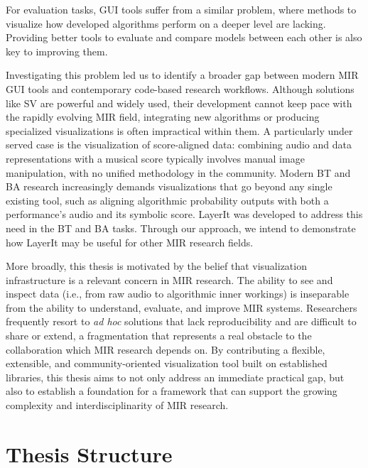 For evaluation tasks, \ac{GUI} tools suffer from a similar problem, where methods to visualize how developed algorithms perform on a deeper level are lacking. Providing better tools to evaluate and compare models between each other is also key to improving them.

Investigating this problem led us to identify a broader gap between modern \ac{MIR} \ac{GUI} tools and contemporary code-based research workflows. Although solutions like \ac{SV} are powerful and widely used, their development cannot keep pace with the rapidly evolving \ac{MIR} field, integrating new algorithms or producing specialized visualizations is often impractical within them. A particularly under served case is the visualization of score-aligned data: combining audio and data representations with a musical score typically involves manual image manipulation, with no unified methodology in the community. Modern \ac{BT} and \ac{BA} research increasingly demands visualizations that go beyond any single existing tool, such as aligning algorithmic probability outputs with both a performance's audio and its symbolic score. LayerIt was developed to address this need in the \ac{BT} and \ac{BA} tasks. Through our approach, we intend to demonstrate how LayerIt may be useful for other \ac{MIR} research fields.

More broadly, this thesis is motivated by the belief that visualization infrastructure is a relevant concern in \ac{MIR} research. The ability to see and inspect data (i.e., from raw audio to algorithmic inner workings) is inseparable from the ability to understand, evaluate, and improve MIR systems. Researchers frequently resort to \textit{ad hoc} solutions that lack reproducibility and are difficult to share or extend, a fragmentation that represents a real obstacle to the collaboration which MIR research depends on. By contributing a flexible, extensible, and community-oriented visualization tool built on established libraries, this thesis aims to not only address an immediate practical gap, but also to establish a foundation for a framework that can support the growing complexity and interdisciplinarity of MIR research.

\section{Thesis Structure} \label{sec:struct}

